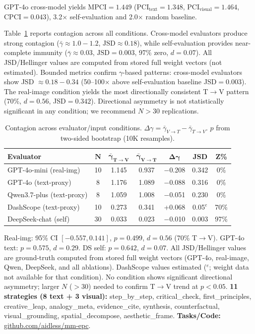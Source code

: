 \documentclass[letterpaper,10pt,twocolumn]{article}
\begin{document}
GPT-4o cross-model yields $\text{MPCI}{=}1.449$ ($\text{PCI}_{\text{text}}{=}1.348$, $\text{PCI}_{\text{visual}}{=}1.464$, $\text{CPCI}{=}0.043$), 3.2$\times$ self-evaluation and 2.0$\times$ random baseline.

Table~\ref{tab:results} reports contagion across all conditions. Cross-model evaluators produce strong contagion ($\bar{\gamma}{\approx}1.0{-}1.2$, $\text{JSD}{\approx}0.18$), while self-evaluation provides near-complete immunity ($\bar{\gamma}{\approx}0.03$, $\text{JSD}{=}0.003$, 97\% zero, $d{=}0.07$). All JSD/Hellinger values are computed from stored full weight vectors (not estimated). Bounded metrics confirm $\gamma$-based patterns: cross-model evaluators show JSD ${\approx}0.18{-}0.34$ (50--100$\times$ above self-evaluation baseline JSD${=}0.003$). The real-image condition yields the most directionally consistent T$\to$V pattern (70\%, $d{=}0.56$, JSD${=}0.342$). Directional asymmetry is not statistically significant in any condition; we recommend $N{>}30$ replications.

\begin{table}[h]
\centering
\caption{Contagion across evaluator/input conditions. $\Delta\gamma = \bar{\gamma}_{V\to T} - \bar{\gamma}_{T\to V}$. $p$ from two-sided bootstrap (10K resamples).}
\label{tab:results}
\footnotesize
\begin{tabular}{lcccccc}
\toprule
\textbf{Evaluator} & $\mathbf{N}$ & $\mathbf{\bar{\gamma}_{T\to V}}$ & $\mathbf{\bar{\gamma}_{V\to T}}$ & $\mathbf{\Delta\gamma}$ & \textbf{JSD} & \textbf{Z\%} \\
\midrule
GPT-4o-mini (real-img) & 10 & 1.145 & 0.937 & $-$0.208 & 0.342 & 0\% \\
GPT-4o (text-proxy)    & 8  & 1.176 & 1.089 & $-$0.088 & 0.316 & 0\% \\
Qwen3.7-plus (text-proxy) & 8  & 1.059 & 1.008 & $-$0.051 & 0.230 & 0\% \\
DashScope (text-proxy) & 10 & 0.273 & 0.341 & +0.068 & 0.05$^e$ & 70\% \\
DeepSeek-chat (self)   & 30 & 0.033 & 0.023 & $-$0.010 & 0.003 & 97\% \\
\bottomrule
\end{tabular}
\vspace{2pt}

{\scriptsize Real-img: 95\% CI $[{-}0.557,0.141]$, $p{=}0.499$, $d{=}0.56$ (70\% T$\to$V). GPT-4o text: $p{=}0.575$, $d{=}0.29$. DS self: $p{=}0.642$, $d{=}0.07$. All JSD/Hellinger values are ground-truth computed from stored full weight vectors (GPT-4o, real-image, Qwen, DeepSeek, and all ablations). DashScope values estimated ($^e$; weight data not available for that condition). No condition shows significant directional asymmetry; larger $N$ ($>30$) needed to confirm T$\to$V trend at $p{<}0.05$. \textbf{11 strategies (8 text + 3 visual):} step\_by\_step, critical\_check, first\_principles, creative\_leap, analogy\_meta, evidence\_cite, synthesis, counterfactual, visual\_grounding, spatial\_decompose, aesthetic\_frame. \textbf{Tasks/Code:} \url{github.com/aidless/mm-epc}.}
\end{table}
\end{document}

